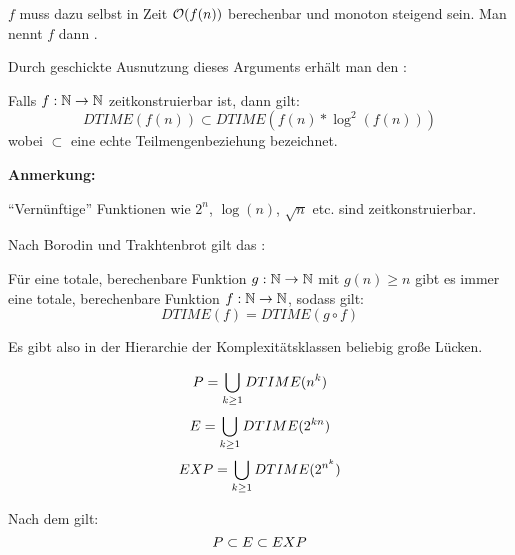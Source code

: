 $f$ muss dazu selbst in Zeit $\mathcal{O}(f(n))$ berechenbar und monoton steigend sein. Man nennt $f$ dann .

Durch geschickte Ausnutzung dieses Arguments erhält man den :

\begin{satz}
    Falls $f: \mathbb{N} \rightarrow \mathbb{N}$ zeitkonstruierbar ist, dann gilt:
    $$ DTIME(f(n)) \subset DTIME(f(n)*\log^2(f(n))) $$
    wobei $\subset$ eine echte Teilmengenbeziehung bezeichnet.
\end{satz}

\textbf{Anmerkung:}

``Vernünftige'' Funktionen wie $2^n$, $\log(n)$, $\sqrt{n}$ etc. sind zeitkonstruierbar.




\begin{satz}
    Nach Borodin und Trakhtenbrot gilt das :

    Für eine totale, berechenbare Funktion $g: \mathbb{N} \rightarrow \mathbb{N}$ mit $g(n) \geq n$ gibt es immer eine totale, berechenbare Funktion $f: \mathbb{N} \rightarrow \mathbb{N}$, sodass gilt:
    $$ DTIME(f) = DTIME (g \circ f) $$

    Es gibt also in der Hierarchie der Komplexitätsklassen beliebig große Lücken.
\end{satz}


\begin{definition}
    $$ P = \bigcup_{k \geq 1} DTIME(n^k) $$
    $$ E = \bigcup_{k \geq 1} DTIME(2^{kn}) $$
    $$ EXP = \bigcup_{k \geq 1} DTIME(2^{n^k}) $$
\end{definition}

Nach dem  gilt:
$$ P \subset E \subset EXP $$


